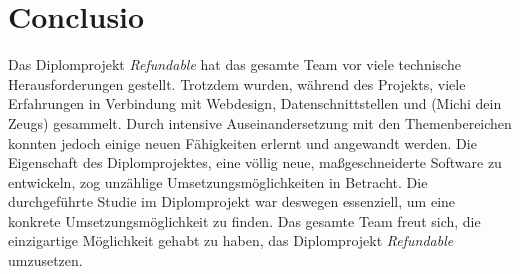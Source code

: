 \chapter{Conclusio}
Das Diplomprojekt \textit{Refundable} hat das gesamte Team vor viele technische Herausforderungen gestellt. Trotzdem wurden, während des Projekts, viele Erfahrungen in Verbindung mit Webdesign, Datenschnittstellen und (Michi dein Zeugs) gesammelt. Durch intensive Auseinandersetzung mit den Themenbereichen konnten jedoch einige neuen Fähigkeiten erlernt und angewandt werden. Die Eigenschaft des Diplomprojektes, eine völlig neue, maßgeschneiderte Software zu entwickeln, zog unzählige Umsetzungsmöglichkeiten in Betracht. Die durchgeführte Studie im Diplomprojekt war deswegen essenziell, um eine konkrete Umsetzungsmöglichkeit zu finden. Das gesamte Team freut sich, die einzigartige Möglichkeit gehabt zu haben, das Diplomprojekt \textit{Refundable} umzusetzen.